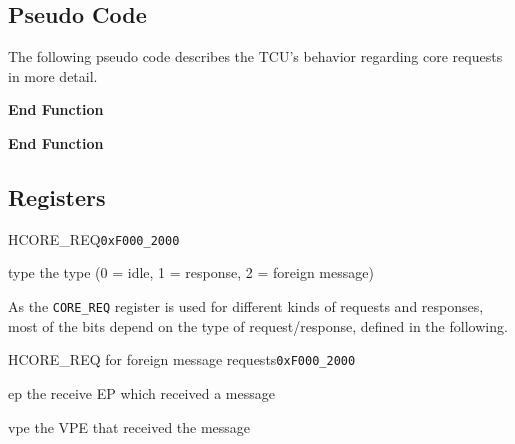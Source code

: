 \subsection{Pseudo Code}

The following pseudo code describes the TCU's behavior regarding core requests in more detail.

\begin{algorithm}[H]
    \textbf{End Function}
    \BlankLine

    \textbf{End Function}
    \caption{Enqueuing and starting of core requests.}
    \label{code:corereqstart}
\end{algorithm}

\begin{algorithm}[H]
    \caption{Dequeuing and finishing of core requests.}
    \label{code:corereqfinish}
\end{algorithm}

\subsection{Registers}

\begin{register}{H}{CORE\_REQ}{\texttt{0xF000\_2000}}
  \regnewline%
  \begin{regdesc}\begin{reglist}
    \item[type] the type (0 = idle, 1 = response, 2 = foreign message)
  \end{reglist}\end{regdesc}
\end{register}

\noindent As the \texttt{CORE\_REQ} register is used for different kinds of requests and responses,
most of the bits depend on the type of request/response, defined in the following.

\begin{register}{H}{CORE\_REQ for foreign message requests}{\texttt{0xF000\_2000}}
  \regnewline%
  \begin{regdesc}\begin{reglist}
    \item[ep] the receive EP which received a message
    \item[vpe] the VPE that received the message
  \end{reglist}\end{regdesc}
\end{register}

